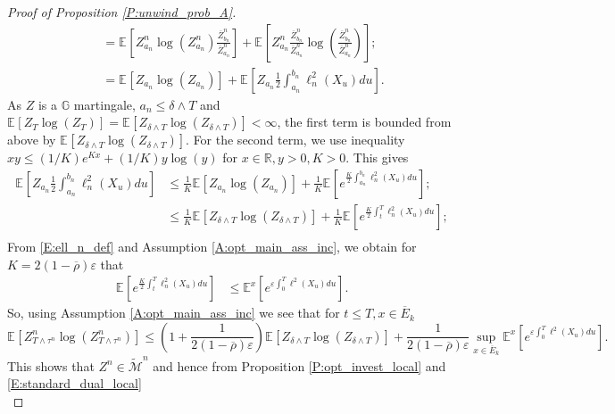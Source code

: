 \documentclass[11pt, letterpaper]{amsart}
\theoremstyle{definition}
\theoremstyle{remark}
\numberwithin{equation}{section}
\newcommand{\reals}{\mathbb R}
\newcommand{\eps}{\varepsilon}
\newcommand{\esp}{\mathbb{E}}
\newcommand{\espalt}[2]{\esp^{#1}\bra{#2}}
\newcommand{\tM}{\widetilde{\mathcal{M}}}
\newcommand{\filtg}{\mathbb{G}}
\newcommand{\bra}[1]{\left[#1\right]}
\newcommand{\ol}[1]{\overline{#1}}
\begin{document}
\begin{proof}[Proof of Proposition \ref{P:unwind_prob_A}]
\begin{equation}
\begin{split}
&\quad = \espalt{}{Z^n_{a_n} \log\left(Z^n_{a_n}\right) \frac{\ol{Z}^n_{b_n}}{\ol{Z}^n_{a_n}}} + \espalt{}{Z^n_{a_n}\frac{\ol{Z}^n_{b_n}}{\ol{Z}^n_{a_n}}\log\left(\frac{\ol{Z}^n_{b_n}}{\ol{Z}^n_{a_n}}\right)};\\
&\quad = \espalt{}{Z_{a_n}\log\left(Z_{a_n}\right)} + \espalt{}{Z_{a_n}\frac{1}{2}\int_{a_n}^{b_n} \ell_n^2(X_u)du}.
\end{split}
\end{equation}
As $Z$ is a $\filtg$ martingale, $a_n\leq \delta\wedge T$ and $\espalt{}{Z_T\log(Z_T)} = \espalt{}{Z_{\delta\wedge T}\log\left(Z_{\delta\wedge T}\right)} < \infty$, the first term is bounded from above by $\espalt{}{Z_{\delta \wedge T}\log\left(Z_{\delta\wedge T}\right)}$. For the second term, we use inequality $xy\leq (1/K)e^{Kx} + (1/K)y\log(y)$ for $x\in \reals, y>0, K >0$.  This gives
\begin{equation}\label{E:rel_ent_aaa}
\begin{split}
\espalt{}{Z_{a_n}\frac{1}{2}\int_{a_n}^{b_n} \ell_n^2(X_u)du} & \leq \frac{1}{K}\espalt{}{Z_{a_n}\log\left(Z_{a_n}\right)} + \frac{1}{K}\espalt{}{e^{\frac{K}{2}\int_{a_n}^{b_n} \ell_n^2(X_u)du}};\\
&\leq \frac{1}{K}\espalt{}{Z_{\delta\wedge T}\log\left(Z_{\delta\wedge T}\right)} + \frac{1}{K}\espalt{}{e^{\frac{K}{2}\int_{t}^{T} \ell_n^2(X_u)du}};\\
\end{split}
\end{equation}
From \eqref{E:ell_n_def} and Assumption \ref{A:opt_main_ass_inc}, we obtain for $K=2(1-\ol{\rho})\eps$ that
\begin{equation*}
\begin{split}
\espalt{}{e^{\frac{K}{2}\int_{t}^{T} \ell_n^2(X_u)du}} &\leq \espalt{x}{e^{\eps\int_0^T\ell^2(X_u)du}}.
\end{split}
\end{equation*}
So, using Assumption \ref{A:opt_main_ass_inc} we see that for $t\leq T, x\in \ol{E}_k$
\begin{equation}\label{E:Z_n_rel_ent_ub}
\espalt{}{Z^n_{T\wedge\tau^n}\log\left(Z^n_{T\wedge\tau^n}\right)} \leq \left(1+\frac{1}{2(1-\ol{\rho})\eps}\right)\espalt{}{Z_{\delta\wedge T}\log\left(Z_{\delta\wedge T}\right)} + \frac{1}{2(1-\ol{\rho})\eps}\sup_{x\in\ol{E}_k} \espalt{x}{e^{\eps\int_0^T\ell^2(X_u)du}}.
\end{equation}
This shows that $Z^n\in\tM^n$ and hence from Proposition \ref{P:opt_invest_local} and \eqref{E:standard_dual_local}
\begin{equation}\label{E:G_n_ub_1}

\end{equation}
\end{proof}
\end{document}
